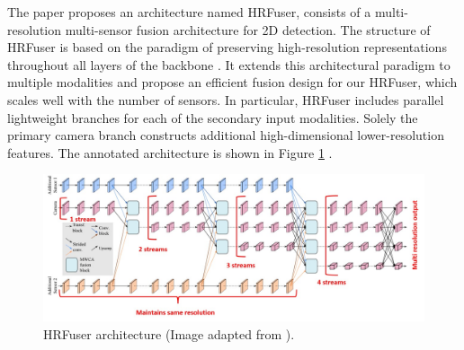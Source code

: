\documentclass[report.tex]{subfiles}
\begin{document}
    The paper proposes an architecture named HRFuser, consists of a multi-resolution multi-sensor fusion architecture for 2D detection. The structure of HRFuser is based on the paradigm of preserving high-resolution representations throughout all layers of the backbone \cite{wang2020hrnet} \cite{yuan2021hrformer}. It extends this architectural paradigm to multiple modalities and propose an efficient fusion design for our HRFuser, which scales well with the number of sensors. In particular, HRFuser includes parallel lightweight branches for each of the secondary input modalities. Solely the primary camera branch constructs additional high-dimensional lower-resolution features. The annotated architecture is shown in Figure \ref{fig:hrfuser_architecture} \cite{broedermann2022hrfuser}.

    \begin{figure}[h]
        \centering
        \includegraphics[width=1.0\textwidth]{images/methods/hrfuser/architecture_annotated.png}
        \caption{HRFuser architecture (Image adapted from \cite{broedermann2022hrfuser}).}
        \label{fig:hrfuser_architecture}
    \end{figure}


\end{document}
